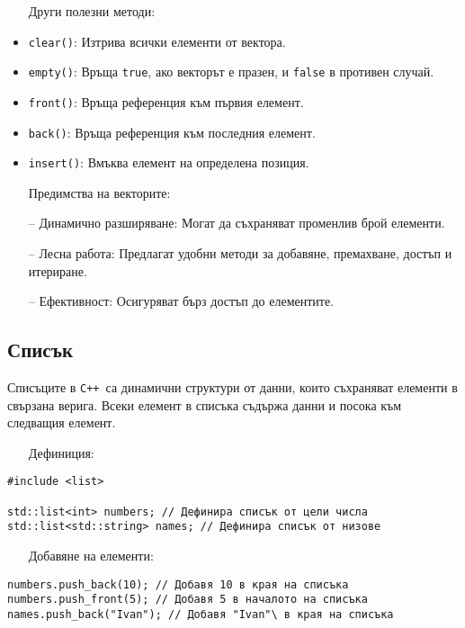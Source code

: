 \documentclass[oneside]{book}
\newcommand*{\code}[1]{\texttt{#1}}
\newcommand*{\cpp}{\texttt{C++}\ }
\begin{document}
\begin{itemize}\item[Други] полезни методи:\end{itemize}
\begin{itemize}
    \item \code{clear()}: Изтрива всички елементи от вектора.
    \item \code{empty()}: Връща \code{true}, ако векторът е празен, и \code{false} в противен случай.
    \item \code{front()}: Връща референция към първия елемент.
    \item \code{back()}: Връща референция към последния елемент.
    \item \code{insert()}: Вмъква елемент на определена позиция.
\end{itemize}

\begin{itemize}\item[Предимства] на векторите:\end{itemize}
\begin{itemize}
    \item[--] Динамично разширяване: Могат да съхраняват променлив брой елементи.
    \item[--] Лесна работа: Предлагат удобни методи за добавяне, премахване, достъп и итериране.
    \item[--] Ефективност: Осигуряват бърз достъп до елементите.
\end{itemize}

\subsection{Списък}
Списъците в \cpp са динамични структури от данни, които съхраняват елементи в свързана верига. Всеки елемент в списъка съдържа данни и посока към следващия елемент.

\begin{itemize}\item[Дефиниция:]\end{itemize}
\begin{mdframed}\begin{lstlisting}
#include <list>

std::list<int> numbers; // Дефинира списък от цели числа
std::list<std::string> names; // Дефинира списък от низове
\end{lstlisting}\end{mdframed}
\pagebreak
\begin{itemize}\item[Добавяне] на елементи:\end{itemize}
\begin{mdframed}\begin{lstlisting}
numbers.push_back(10); // Добавя 10 в края на списъка
numbers.push_front(5); // Добавя 5 в началото на списъка
names.push_back("Ivan"); // Добавя "Ivan"\ в края на списъка
\end{lstlisting}\end{mdframed}
\end{document}
